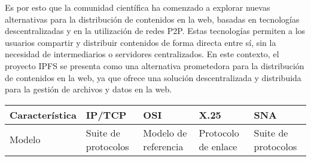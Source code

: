 Es por esto que la comunidad científica ha comenzado a explorar nuevas alternativas para la distribución de contenidos en la web, basadas en tecnologías descentralizadas y en la utilización de redes P2P. Estas tecnologías permiten a los usuarios compartir y distribuir contenidos de forma directa entre sí, sin la necesidad de intermediarios o servidores centralizados. En este contexto, el proyecto IPFS se presenta como una alternativa prometedora para la distribución de contenidos en la web, ya que ofrece una solución descentralizada y distribuida para la gestión de archivos y datos en la web.


\newpage
\begingroup
\renewcommand*{\arraystretch}{1.5}
\small %
\begin{longtable}{|>{\raggedright\arraybackslash}m{2.4cm}|>{\raggedright\arraybackslash}m{2.8cm}|>{\raggedright\arraybackslash}m{2.8cm}|>{\raggedright\arraybackslash}m{2.8cm}|>{\raggedright\arraybackslash}m{2.8cm}|}
      \hline
      \textbf{Característica} & \textbf{IP/TCP}                                                                                                                                                                        & \textbf{OSI}                                                                                                                                                                                                                                         & \textbf{X.25}                                                                                                                                                                                                                                                                                                                                                                    & \textbf{SNA}                                                                                                                                                                                                                                                                           \\ \hline
      Modelo                  & Suite de protocolos                                                                                                                                                                    & Modelo de referencia                                                                                                                                                                                                                                 & Protocolo de enlace                                                                                                                                                                                                                                                                                                                                                              & Suite de protocolos                                                                                                                                                                                                                                                                    \\ \hline

\end{longtable}
